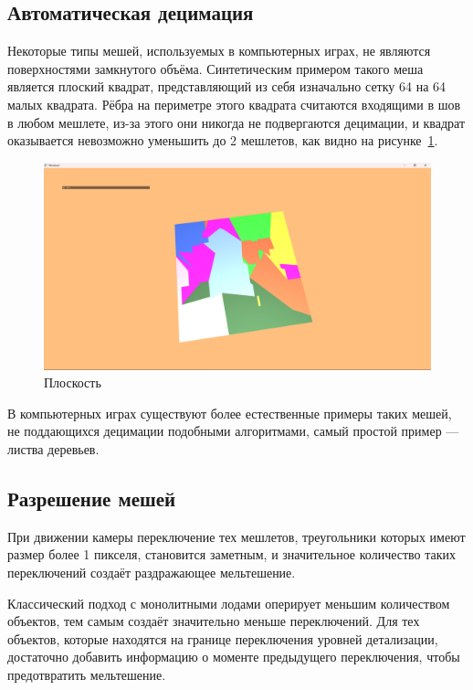\subsection*{Автоматическая децимация}
Некоторые типы мешей, используемых в компьютерных играх, не являются поверхностями замкнутого объёма.
Синтетическим примером такого меша является плоский квадрат, представляющий из себя изначально сетку 64 на 64 малых квадрата.
Рёбра на периметре этого квадрата считаются входящими в шов в любом мешлете, из-за этого они никогда не подвергаются децимации, и квадрат оказывается невозможно уменьшить до 2 мешлетов, как видно на рисунке~\ref{fig:plane-1}.
\begin{figure}[h]
    \centering
    \includegraphics[width=\textwidth]{plane1.png}
    \caption{Плоскость}
    \label{fig:plane-1}
\end{figure}

В компьютерных играх существуют более естественные примеры таких мешей, не поддающихся децимации подобными алгоритмами, самый простой пример --- листва деревьев.

\subsection*{Разрешение мешей}
При движении камеры переключение тех мешлетов, треугольники которых имеют размер более 1 пикселя, становится заметным, и значительное количество таких переключений создаёт раздражающее мельтешение.

Классический подход с монолитными лодами оперирует меньшим количеством объектов, тем самым создаёт значительно меньше переключений.
Для тех объектов, которые находятся на границе переключения уровней детализации, достаточно добавить информацию о моменте предыдущего переключения, чтобы предотвратить мельтешение.
